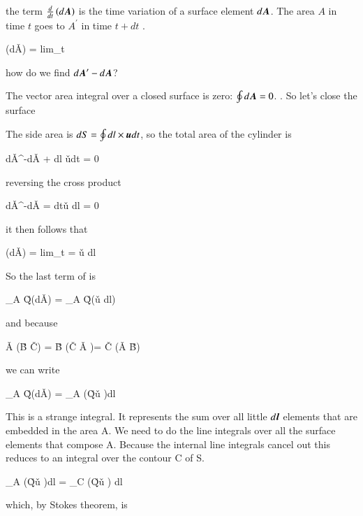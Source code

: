 the term $\frac{d}{dt}\left(d{\boldsymbol{A}}\right)$ is the time variation of
a surface element $d{\boldsymbol{A}}$. The area $A$ in time $t$ goes to $A^\prime$
in time $t+dt$ . 


\beq
{}\left(d\v{A}\right)  = {\rm lim}_{\Delta t}
\eeq

how do we find $d{\boldsymbol{A}}^\prime - d{\boldsymbol{A}}$?

The vector area integral over a closed surface is zero: $\oint d{\boldsymbol{A}}
= 0$. . So let's close the surface  

The side area is $dS = \oint dl \times {\boldsymbol{u}}dt$, so the total area of the
cylinder is

\beq
d\v{A}^\prime -d\v{A} + \oint dl \times \v{u}dt = 0
\eeq

reversing the cross product 

\beq
d\v{A}^\prime -d\v{A} = dt\oint \v{u} \times dl = 0
\eeq

it then follows that

\beq
{}\left(d\v{A}\right)  = {\rm lim}_{\Delta t}
 = \oint \v{u} \times dl
\eeq

So the last term of  is

\beq
\int_A \v{Q}\cdot {}\left(d\v{A}\right) = \int_A \oint \v{Q}\cdot\left(\v{u} \times dl\right)
\eeq

and because 

\beq
\v{A} \cdot \left(\v{B} \times \v{C}\right) = \v{B} \cdot \left(\v{C} \times \v{A} \right)= \v{C} \cdot \left(\v{A} \times \v{B}\right)
\eeq

we can write 

\beq
\int_A \v{Q}\cdot {}\left(d\v{A}\right) = \int_A \oint \left(\v{Q}\times\v{u} \right)\cdot dl
\eeq

This is a strange integral. It represents the sum over all little
$d{\boldsymbol{l}}$ elements that are 
embedded in the area A. We need to do the line integrals over all the
surface elements that compose A. Because the internal line integrals
cancel out  this reduces
to an integral over the contour C of S.

\beq
\int_A \oint \left(\v{Q}\times\v{u} \right)\cdot dl = \oint_C
\left(\v{Q}\times\v{u} \right) dl 
\eeq

which, by Stokes theorem, is


